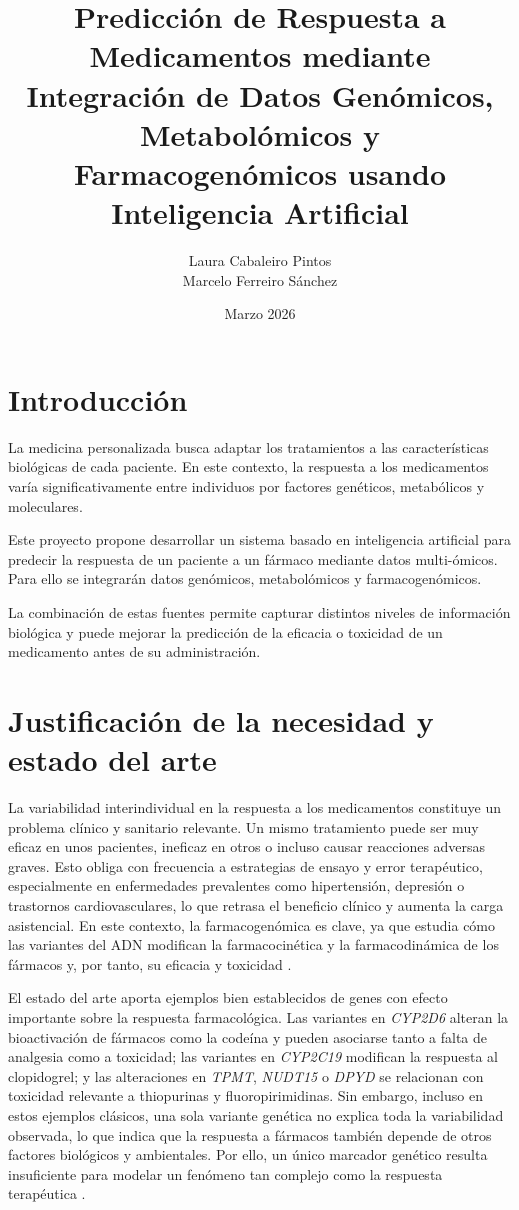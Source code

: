 \documentclass[11pt]{article}
\title{\textbf{Predicción de Respuesta a Medicamentos mediante Integración de Datos Genómicos, Metabolómicos y Farmacogenómicos usando Inteligencia Artificial}}
\author{
Laura Cabaleiro Pintos \\
Marcelo Ferreiro Sánchez \\
}
\date{Marzo 2026}
\begin{document}
\maketitle

\section{Introducción}

La medicina personalizada busca adaptar los tratamientos a las características biológicas de cada paciente. En este contexto, la respuesta a los medicamentos varía significativamente entre individuos por factores genéticos, metabólicos y moleculares.

Este proyecto propone desarrollar un sistema basado en inteligencia artificial para predecir la respuesta de un paciente a un fármaco mediante datos multi-ómicos. Para ello se integrarán datos genómicos, metabolómicos y farmacogenómicos.

La combinación de estas fuentes permite capturar distintos niveles de información biológica y puede mejorar la predicción de la eficacia o toxicidad de un medicamento antes de su administración.

\section{Justificación de la necesidad y estado del arte}

La variabilidad interindividual en la respuesta a los medicamentos constituye un problema clínico y sanitario relevante. Un mismo tratamiento puede ser muy eficaz en unos pacientes, ineficaz en otros o incluso causar reacciones adversas graves. Esto obliga con frecuencia a estrategias de ensayo y error terapéutico, especialmente en enfermedades prevalentes como hipertensión, depresión o trastornos cardiovasculares, lo que retrasa el beneficio clínico y aumenta la carga asistencial. En este contexto, la farmacogenómica es clave, ya que estudia cómo las variantes del ADN modifican la farmacocinética y la farmacodinámica de los fármacos y, por tanto, su eficacia y toxicidad \cite{pharmacogenomics_review}.

El estado del arte aporta ejemplos bien establecidos de genes con efecto importante sobre la respuesta farmacológica. Las variantes en \textit{CYP2D6} alteran la bioactivación de fármacos como la codeína y pueden asociarse tanto a falta de analgesia como a toxicidad; las variantes en \textit{CYP2C19} modifican la respuesta al clopidogrel; y las alteraciones en \textit{TPMT}, \textit{NUDT15} o \textit{DPYD} se relacionan con toxicidad relevante a thiopurinas y fluoropirimidinas. Sin embargo, incluso en estos ejemplos clásicos, una sola variante genética no explica toda la variabilidad observada, lo que indica que la respuesta a fármacos también depende de otros factores biológicos y ambientales. Por ello, un único marcador genético resulta insuficiente para modelar un fenómeno tan complejo como la respuesta terapéutica \cite{pharmacogenomics_review}.
\end{document}
